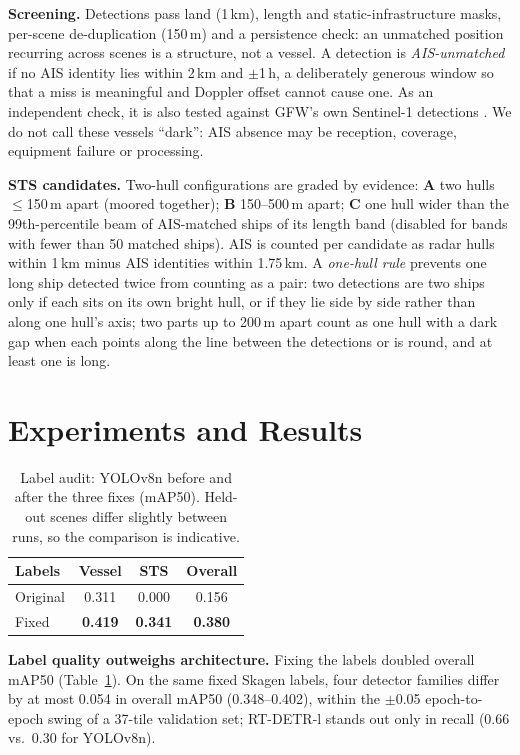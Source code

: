 \documentclass[conference]{IEEEtran}
\begin{document}
\textbf{Screening.} Detections pass land (1\,km), length and static-infrastructure
masks, per-scene de-duplication (150\,m) and a persistence check: an unmatched position
recurring across scenes is a structure, not a vessel. A detection is
\emph{AIS-unmatched} if no AIS identity lies within 2\,km and $\pm$1\,h, a deliberately
generous window so that a miss is meaningful and Doppler offset cannot cause one. As an
independent check, it is also tested against GFW's own Sentinel-1 detections
\cite{paolo2024}. We do not call these vessels ``dark'': AIS absence may be reception,
coverage, equipment failure or processing. %

\textbf{STS candidates.} Two-hull configurations are graded by evidence: \textbf{A} two
hulls $\le$150\,m apart (moored together); \textbf{B} 150--500\,m apart; \textbf{C} one
hull wider than the 99th-percentile beam of AIS-matched ships of its length band
(disabled for bands with fewer than 50 matched ships). AIS is counted per candidate as
radar hulls within 1\,km minus AIS identities within 1.75\,km. A \emph{one-hull rule}
prevents one long ship detected twice from counting as a pair: two detections are two
ships only if each sits on its own bright hull, or if they lie side by side rather than
along one hull's axis; two parts up to 200\,m apart count as one hull with a dark gap when each points along the
line between the detections or is round, and at least one is long. %

\section{Experiments and Results}
\label{sec:results}

\begin{table}[t]
\caption{Label audit: YOLOv8n before and after the three fixes (mAP50). Held-out scenes
differ slightly between runs, so the comparison is indicative.}
\label{tab:labelfix}
\centering\small
\begin{tabular}{lccc}
\toprule
Labels & Vessel & STS & Overall \\
\midrule
Original & 0.311 & 0.000 & 0.156 \\
Fixed    & \textbf{0.419} & \textbf{0.341} & \textbf{0.380} \\
\bottomrule
\end{tabular}
\end{table}

\textbf{Label quality outweighs architecture.} Fixing the labels doubled overall mAP50
(Table~\ref{tab:labelfix}). On the same fixed Skagen labels, four detector families
differ by at most 0.054 in overall mAP50 (0.348--0.402), within the $\pm$0.05
epoch-to-epoch swing of a 37-tile validation set; RT-DETR-l stands out only in recall
(0.66 vs.\ 0.30 for YOLOv8n). %
\end{document}
